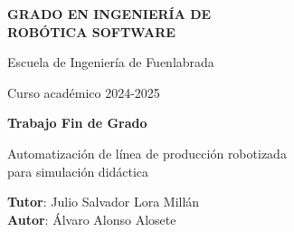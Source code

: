 \thispagestyle{empty}
\vspace{2cm}

\begin{figure}[htb]
  \centerline{}
\end{figure}

\begin{center}
  {\Large {\bf GRADO EN INGENIERÍA DE\\ 
                ROBÓTICA SOFTWARE}}
  \vspace{5mm}
 
  {\large {Escuela de Ingeniería de Fuenlabrada}}
  \vspace{5mm}

  {\large {Curso académico 2024-2025}}

  \vspace{1cm}

  {\large {\bf Trabajo Fin de Grado}}

  \vspace{2cm}

  {\Large {Automatización de línea de producción robotizada  \\
              para simulación didáctica\\[1cm] }}

  \vspace{4cm}
  {\bf Tutor}: Julio Salvador Lora Millán \\
  {\bf Autor}: Álvaro Alonso Alosete
\end{center}

\clearpage
\thispagestyle{empty}
